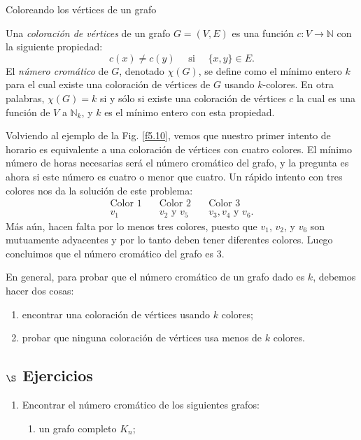 \begin{section}{Coloreando los vértices de un grafo}
\begin{definicion} Una \textit{coloración de vértices} de un   grafo $G=(V,E)$ es una función $c:V \to  \mathbb N$ con la siguiente propiedad:
$$
c(x)\not= c(y) \quad \text{ si } \quad \{x,y\} \in E.
$$
El \textit{número cromático} de $G$, denotado $\chi(G)$, se define  como el mínimo entero $k$ para el cual existe una coloración de vértices de $G$ usando $k$-colores. En otra palabras, $\chi(G)=k$ si  y sólo si existe una coloración de vértices $c$ la cual es una función de $V$ a $\mathbb N_k$, y $k$ es el mínimo entero con esta propiedad. 
\end{definicion}

Volviendo al ejemplo de la Fig. \ref{f5.10}, vemos que nuestro primer intento de horario es equivalente a una coloración de vértices con cuatro colores. El mínimo número de horas necesarias será el número cromático del grafo, y la pregunta es ahora si este número es cuatro o menor que cuatro. Un rápido intento con tres
colores nos da la solución de este problema: 
$$
\begin{matrix}
\text{Color 1}\quad &\text{Color 2}\quad&\text{Color 3} \\
v_1 &v_2 \text{ y } v_5 \quad & v_3,v_4 \text{ y } v_6 .
\end{matrix}
$$
Más aún, hacen falta por lo menos tres colores, puesto que $v_1$, $v_2$, y $v_6$ son mutuamente adyacentes y por lo tanto deben tener diferentes colores. Luego concluimos que el número cromático del grafo es $3$.

En general, para probar que el número cromático de un grafo dado es $k$, debemos hacer dos cosas:
\begin{enumerate}[label=\textit{\alph*)}] 
    \item  encontrar una coloración de vértices usando $k$ colores;
    \item  probar que ninguna coloración de vértices usa menos de $k$ colores.
\end{enumerate}

\subsection*{$\S$ Ejercicios}\label{ejercicios5.6}
\begin{enumerate}
\item \label{ejercicio5.6.1} Encontrar el número cromático de los siguientes grafos:
\begin{enumerate}
    \item un grafo completo $K_n$;
    

\end{enumerate}
\end{enumerate}
\end{section}
